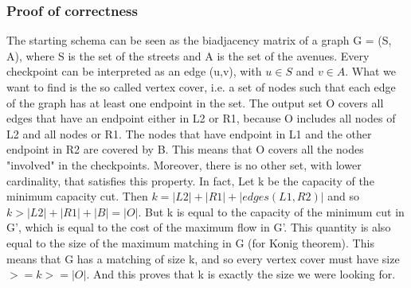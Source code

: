 \subsubsection{Proof of correctness}
The starting schema can be seen as the biadjacency matrix of a graph G = (S, A), where S is the set of the streets and A is the set of the avenues. Every checkpoint can be interpreted as an edge (u,v), with $u \in S$ and $v \in A$. What we want to find is the so called vertex cover, i.e. a set of nodes such that each edge of the graph has at least one endpoint in the set.
The output set O covers all edges that have an endpoint either in L2 or R1, because O includes all nodes of L2 and all nodes or R1. The nodes that have endpoint in L1 and the other endpoint in R2 are covered by B. This means that O covers all the nodes "involved" in the checkpoints. Moreover, there is no other set, with lower cardinality, that satisfies this property. In fact, Let k be the capacity of the minimum capacity cut. Then $k = |L2| + |R1| + |edges(L1,R2)|$ and so $k > |L2| + |R1| + |B| = |O|$. But k is equal to the capacity of the minimum cut in G', which is equal to the cost of the maximum flow in G'. This quantity  is also equal to the size of the maximum matching in G (for Konig theorem). This means that G has a matching of size k, and so every vertex cover must have size $>= k >= |O|$. And this proves that k is exactly the size we were looking for.